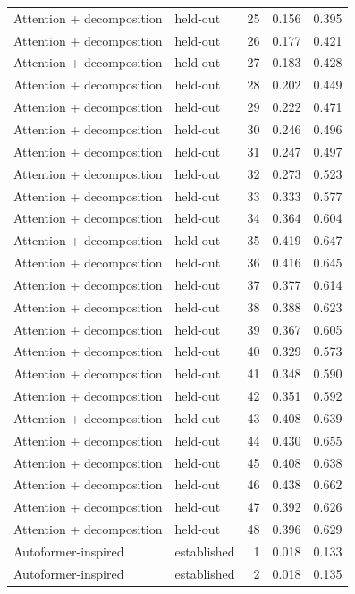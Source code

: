 \begin{tabular}{llrrr}
Attention + decomposition & held-out & 25 & 0.156 & 0.395 \\
Attention + decomposition & held-out & 26 & 0.177 & 0.421 \\
Attention + decomposition & held-out & 27 & 0.183 & 0.428 \\
Attention + decomposition & held-out & 28 & 0.202 & 0.449 \\
Attention + decomposition & held-out & 29 & 0.222 & 0.471 \\
Attention + decomposition & held-out & 30 & 0.246 & 0.496 \\
Attention + decomposition & held-out & 31 & 0.247 & 0.497 \\
Attention + decomposition & held-out & 32 & 0.273 & 0.523 \\
Attention + decomposition & held-out & 33 & 0.333 & 0.577 \\
Attention + decomposition & held-out & 34 & 0.364 & 0.604 \\
Attention + decomposition & held-out & 35 & 0.419 & 0.647 \\
Attention + decomposition & held-out & 36 & 0.416 & 0.645 \\
Attention + decomposition & held-out & 37 & 0.377 & 0.614 \\
Attention + decomposition & held-out & 38 & 0.388 & 0.623 \\
Attention + decomposition & held-out & 39 & 0.367 & 0.605 \\
Attention + decomposition & held-out & 40 & 0.329 & 0.573 \\
Attention + decomposition & held-out & 41 & 0.348 & 0.590 \\
Attention + decomposition & held-out & 42 & 0.351 & 0.592 \\
Attention + decomposition & held-out & 43 & 0.408 & 0.639 \\
Attention + decomposition & held-out & 44 & 0.430 & 0.655 \\
Attention + decomposition & held-out & 45 & 0.408 & 0.638 \\
Attention + decomposition & held-out & 46 & 0.438 & 0.662 \\
Attention + decomposition & held-out & 47 & 0.392 & 0.626 \\
Attention + decomposition & held-out & 48 & 0.396 & 0.629 \\
Autoformer-inspired & established & 1 & 0.018 & 0.133 \\
Autoformer-inspired & established & 2 & 0.018 & 0.135 \\

\end{tabular}
